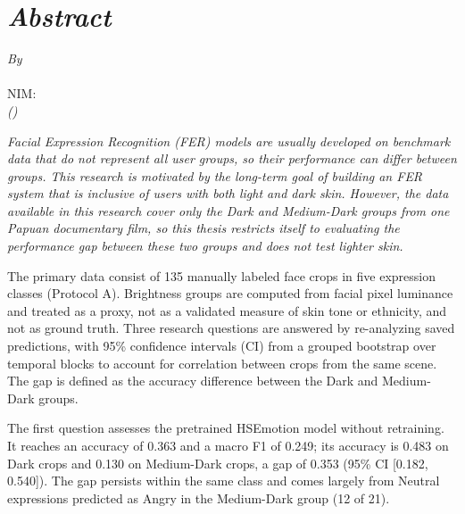 \chapter*{\textit{Abstract}}

\begin{center}
{\bfseries\itshape\fontsize{14}{14}\selectfont \ThesisTitleEN}

\vspace{1\baselineskip}
\textit{By}\\
\textbf{\ThesisAuthor}\\
NIM: \ThesisNIM\\
\textit{(\ThesisProgramEN)}
\end{center}

\vspace{1\baselineskip}

\itshape
Facial Expression Recognition (FER) models are usually developed on benchmark data that do not represent all user groups, so their performance can differ between groups. This research is motivated by the long-term goal of building an FER system that is inclusive of users with both light and dark skin. However, the data available in this research cover only the Dark and Medium-Dark groups from one Papuan documentary film, so this thesis restricts itself to evaluating the performance gap between these two groups and does not test lighter skin.

The primary data consist of 135 manually labeled face crops in five expression classes (Protocol A). Brightness groups are computed from facial pixel luminance and treated as a proxy, not as a validated measure of skin tone or ethnicity, and not as ground truth. Three research questions are answered by re-analyzing saved predictions, with 95\% confidence intervals (CI) from a grouped bootstrap over temporal blocks to account for correlation between crops from the same scene. The gap is defined as the accuracy difference between the Dark and Medium-Dark groups.

The first question assesses the pretrained HSEmotion model without retraining. It reaches an accuracy of 0.363 and a macro F1 of 0.249; its accuracy is 0.483 on Dark crops and 0.130 on Medium-Dark crops, a gap of 0.353 (95\% CI [0.182, 0.540]). The gap persists within the same class and comes largely from Neutral expressions predicted as Angry in the Medium-Dark group (12 of 21).

